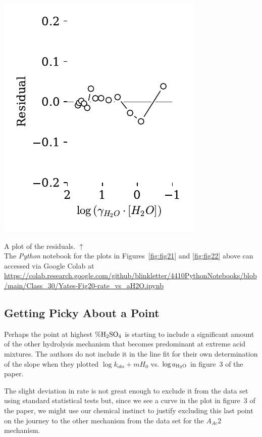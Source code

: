 \documentclass[]{tufte-handout}
\begin{document}
\begin{marginfigure}[-40mm]
  \centering
  \includegraphics[scale=0.7]{images/fig21r}
  \caption{A plot of the residuals. $\uparrow$  \\ \vspace{3mm} The \textit{Python} notebook for the plots in Figures~\ref{fig:fig21} and \ref{fig:fig22} above can accessed via Google Colab at \url{https://colab.research.google.com/github/blinkletter/4410PythonNotebooks/blob/main/Class_30/Yates-Fig20-rate_vs_aH2O.ipynb}} 
  \label{fig:fig22}
\end{marginfigure}





\subsection{Getting Picky About a Point}

Perhaps the point at highest $\% \ce{H2SO4}$ is starting to include a significant amount of the other hydrolysis mechanism that becomes predominant at extreme acid mixtures. The authors do not include it in the line fit for their own determination of the slope when they plotted $\log{k_{obs}}+m H_0$ vs. $\log{a_{\ce{H2O}}}$ in figure~3 of the paper.  

The slight deviation in rate is not great enough to exclude it from the data set using standard statistical tests but, since we see a curve in the plot in figure~3 of the paper, we might use our chemical instinct to justify excluding this last point on the journey to the other mechanism from the data set for the $A_{Ac}2$ mechanism.
\end{document}
